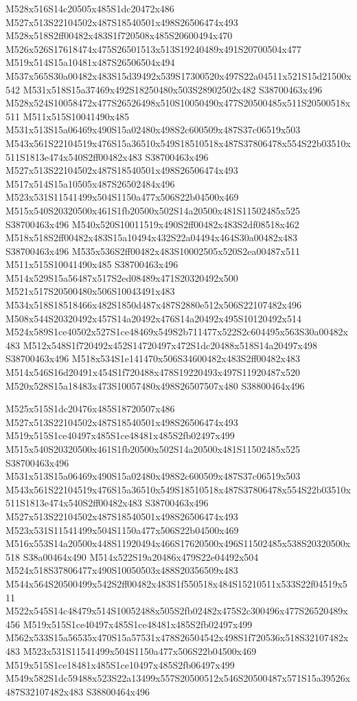 \documentclass{article}
\begin{document}
\begin{multicols}{2}
M528x516S14c20505x485S1dc20472x486 M527x513S22104502x487S18540501x498S26506474x493 M528x518S2ff00482x483S1f720508x485S20600494x470 M526x526S17618474x475S26501513x513S19240489x491S20700504x477 M519x514S15a10481x487S26506504x494 M537x565S30a00482x483S15d39492x539S17300520x497S22a04511x521S15d21500x542 M531x518S15a37469x492S18250480x503S28902502x482 S38700463x496 M528x524S10058472x477S26526498x510S10050490x477S20500485x511S20500518x511 M511x515S10041490x485 M531x513S15a06469x490S15a02480x498S2c600509x487S37c06519x503 M543x561S22104519x476S15a36510x549S18510518x487S37806478x554S22b03510x511S1813e474x540S2ff00482x483 S38700463x496 M527x513S22104502x487S18540501x498S26506474x493 M517x514S15a10505x487S26502484x496 M523x531S11541499x504S1150a477x506S22b04500x469 M515x540S20320500x461S1fb20500x502S14a20500x481S11502485x525 S38700463x496 M540x520S10011519x490S2ff00482x483S2df08518x462 M518x518S2ff00482x483S15a10494x432S22a04494x464S30a00482x483 S38700463x496 M535x536S2ff00482x483S10002505x520S2ea00487x511 M511x515S10041490x485 S38700463x496 M514x529S15a56487x517S2ed08489x471S20320492x500 M521x517S20500480x506S10043491x483 M534x518S18518466x482S1850d487x487S2880e512x506S22107482x496 M508x544S20320492x457S14a20492x476S14a20492x495S10120492x514 M524x589S1ce40502x527S1ce48469x549S2b711477x522S2c604495x563S30a00482x483 M512x548S1f720492x452S14720497x472S1dc20488x518S14a20497x498 S38700463x496 M518x534S1e141470x506S34600482x483S2ff00482x483 M514x546S16d20491x454S1f720488x478S19220493x497S11920487x520 M520x528S15a18483x473S10057480x498S26507507x480 S38800464x496

M525x515S1dc20476x485S18720507x486 M527x513S22104502x487S18540501x498S26506474x493 M519x515S1ce40497x485S1ce48481x485S2fb02497x499 M515x540S20320500x461S1fb20500x502S14a20500x481S11502485x525 S38700463x496 M531x513S15a06469x490S15a02480x498S2c600509x487S37c06519x503 M543x561S22104519x476S15a36510x549S18510518x487S37806478x554S22b03510x511S1813e474x540S2ff00482x483 S38700463x496 M527x513S22104502x487S18540501x498S26506474x493 M523x531S11541499x504S1150a477x506S22b04500x469 M516x553S14a20500x448S11920494x466S17620500x496S11502485x538S20320500x518 S38a00464x490 M514x522S19a20486x479S22e04492x504 M524x518S37806477x490S10050503x488S20356509x483 M544x564S20500499x542S2ff00482x483S1f550518x484S15210511x533S22f04519x511 M522x545S14c48479x514S10052488x505S2fb02482x475S2c300496x477S26520489x456 M519x515S1ce40497x485S1ce48481x485S2fb02497x499 M562x533S15a56535x470S15a57531x478S26504542x498S1f720536x518S32107482x483 M523x531S11541499x504S1150a477x506S22b04500x469 M519x515S1ce18481x485S1ce10497x485S2fb06497x499 M549x582S1dc59488x523S22a13499x557S20500512x546S20500487x571S15a39526x487S32107482x483 S38800464x496


\end{multicols}
\end{document}
